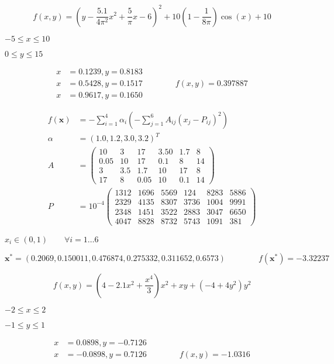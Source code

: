 \documentclass{article}
\begin{document}
\[ f(x,y) = \left(y-\frac{5.1}{4\pi^2}x^2 + \frac{5}{\pi}x-6\right)^2 + 10\left(1-\frac{1}{8\pi}\right) \cos(x) + 10 \]
\pagebreak

$-5 \leq x \leq 10$
\pagebreak

$0 \leq y \leq 15$
\pagebreak

\begin{align*} x &= 0.1239, y = 0.8183\\ x &= 0.5428, y = 0.1517 \qquad \qquad f(x,y) = 0.397887\\ x &= 0.9617, y = 0.1650 \end{align*}
\pagebreak

\begin{align*} f(\mathbf{x}) &= - \sum_{i=1}^{4} \alpha_i \left( -\sum_{j=1}^{6} A_{ij} \left( x_j - P_{ij}\right)^2 \right)\\ \alpha &= \left( 1.0, 1.2, 3.0, 3.2 \right)^T\\ A &= \left(\begin{array}{cccccc} 10 & 3 & 17 & 3.50 & 1.7 & 8 \\ 0.05 & 10 & 17 & 0.1 & 8 & 14 \\ 3 & 3.5 & 1.7 & 10 & 17 & 8 \\ 17 & 8 & 0.05 & 10 & 0.1 & 14 \end{array}\right) \\ P &= 10^{-4} \left(\begin{array}{cccccc} 1312 & 1696 & 5569 & 124 & 8283 & 5886 \\ 2329 & 4135 & 8307 & 3736 & 1004 & 9991 \\ 2348 & 1451 & 3522 & 2883 & 3047 & 6650 \\ 4047 & 8828 & 8732 & 5743 & 1091 & 381 \end{array}\right) \end{align*}
\pagebreak

$x_i \in (0,1) \qquad \forall i=1\ldots6$
\pagebreak

\[ \mathbf{x}^* = \left(0.2069, 0.150011, 0.476874, 0.275332, 0.311652, 0.6573 \right) \qquad \qquad f(\mathbf{x}^*) = -3.32237 \]
\pagebreak

\[ f(x,y) = \left(4 - 2.1x^2 + \frac{x^4}{3}\right) x^2 + x y + \left(-4 + 4y^2\right) y^2 \]
\pagebreak

$-2 \leq x \leq 2$
\pagebreak

$-1 \leq y \leq 1$
\pagebreak

\begin{align*} x &= 0.0898, y = -0.7126\\ x &= -0.0898, y = 0.7126 \qquad \qquad f(x,y) = -1.0316 \end{align*}
\pagebreak
\end{document}
